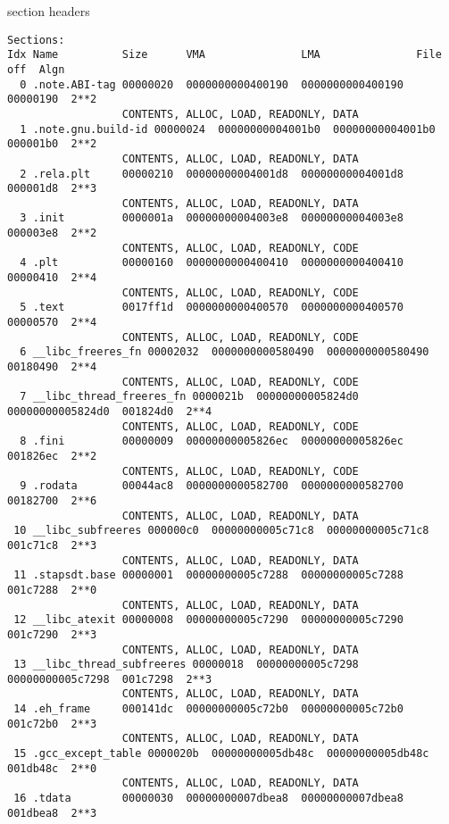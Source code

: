 \usetikzlibrary{calc}

\begin{frame}[fragile,label=sectHeader]{section headers}
\vspace{-.25cm}
\begin{Verbatim}[fontsize=\tiny]
Sections:
Idx Name          Size      VMA               LMA               File off  Algn
  0 .note.ABI-tag 00000020  0000000000400190  0000000000400190  00000190  2**2
                  CONTENTS, ALLOC, LOAD, READONLY, DATA
  1 .note.gnu.build-id 00000024  00000000004001b0  00000000004001b0  000001b0  2**2
                  CONTENTS, ALLOC, LOAD, READONLY, DATA
  2 .rela.plt     00000210  00000000004001d8  00000000004001d8  000001d8  2**3
                  CONTENTS, ALLOC, LOAD, READONLY, DATA
  3 .init         0000001a  00000000004003e8  00000000004003e8  000003e8  2**2
                  CONTENTS, ALLOC, LOAD, READONLY, CODE
  4 .plt          00000160  0000000000400410  0000000000400410  00000410  2**4
                  CONTENTS, ALLOC, LOAD, READONLY, CODE
  5 .text         0017ff1d  0000000000400570  0000000000400570  00000570  2**4
                  CONTENTS, ALLOC, LOAD, READONLY, CODE
  6 __libc_freeres_fn 00002032  0000000000580490  0000000000580490  00180490  2**4
                  CONTENTS, ALLOC, LOAD, READONLY, CODE
  7 __libc_thread_freeres_fn 0000021b  00000000005824d0  00000000005824d0  001824d0  2**4
                  CONTENTS, ALLOC, LOAD, READONLY, CODE
  8 .fini         00000009  00000000005826ec  00000000005826ec  001826ec  2**2
                  CONTENTS, ALLOC, LOAD, READONLY, CODE
  9 .rodata       00044ac8  0000000000582700  0000000000582700  00182700  2**6
                  CONTENTS, ALLOC, LOAD, READONLY, DATA
 10 __libc_subfreeres 000000c0  00000000005c71c8  00000000005c71c8  001c71c8  2**3
                  CONTENTS, ALLOC, LOAD, READONLY, DATA
 11 .stapsdt.base 00000001  00000000005c7288  00000000005c7288  001c7288  2**0
                  CONTENTS, ALLOC, LOAD, READONLY, DATA
 12 __libc_atexit 00000008  00000000005c7290  00000000005c7290  001c7290  2**3
                  CONTENTS, ALLOC, LOAD, READONLY, DATA
 13 __libc_thread_subfreeres 00000018  00000000005c7298  00000000005c7298  001c7298  2**3
                  CONTENTS, ALLOC, LOAD, READONLY, DATA
 14 .eh_frame     000141dc  00000000005c72b0  00000000005c72b0  001c72b0  2**3
                  CONTENTS, ALLOC, LOAD, READONLY, DATA
 15 .gcc_except_table 0000020b  00000000005db48c  00000000005db48c  001db48c  2**0
                  CONTENTS, ALLOC, LOAD, READONLY, DATA
 16 .tdata        00000030  00000000007dbea8  00000000007dbea8  001dbea8  2**3

\end{Verbatim}
\end{frame}
